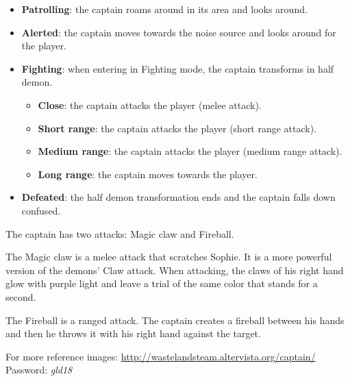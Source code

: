 \begin{itemize}
	\item \textbf{Patrolling}: the captain roams around in its area and looks around.
	\item \textbf{Alerted}: the captain moves towards the noise source and looks around for the player.
	\item \textbf{Fighting}: when entering in Fighting mode, the captain transforms in half demon.
	\begin{itemize}
		\item \textbf{Close}: the captain attacks the player (melee attack).
		\item \textbf{Short range}: the captain attacks the player (short range attack).
		\item \textbf{Medium range}: the captain attacks the player (medium range attack).
		\item \textbf{Long range}: the captain moves towards the player.
	\end{itemize}
	\item \textbf{Defeated}: the half demon transformation ends and the captain falls down confused.
\end{itemize}

The captain has two attacks: Magic claw and Fireball.

The Magic claw is a melee attack that scratches Sophie. It is a more powerful version of the demons' Claw attack. When attacking, the claws of his right hand glow with purple light and leave a trial of the same color that stands for a second.

The Fireball is a ranged attack. The captain creates a fireball between his hands and then he throws it with his right hand against the target.

For more reference images: \url{http://wastelandsteam.altervista.org/captain/}\\
Password: \textit{gld18}
